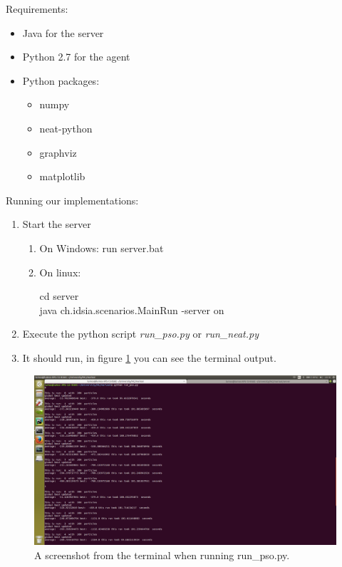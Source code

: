 \documentclass[]{article}
\begin{document}
Requirements:
\begin{itemize}
    \item Java for the server
    \item Python 2.7 for the agent
    \item Python packages:
    \begin{itemize}
        \item numpy
        \item neat-python
        \item graphviz
        \item matplotlib
    \end{itemize}
\end{itemize}

Running our implementations:
\begin{enumerate}
    \item Start the server
    \begin{enumerate}
        \item On Windows: run server.bat
        \item On linux: \\
        \begin{emph}
            cd server \\
            java ch.idsia.scenarios.MainRun -server on
        \end{emph}
    \end{enumerate}
    \item Execute the python script \textit{run\_pso.py} or \textit{run\_neat.py}
    \item It should run, in figure \ref{fig:runpso} you can see the terminal output.  
\end{enumerate}

\begin{figure}[h]
    \centering
    \includegraphics[width=0.8\linewidth]{images/Screenshot from 2017-06-27 20-10-29.png}
    \caption{A screenshot from the terminal when running run\_pso.py.}
    \label{fig:runpso}
\end{figure}
\end{document}
